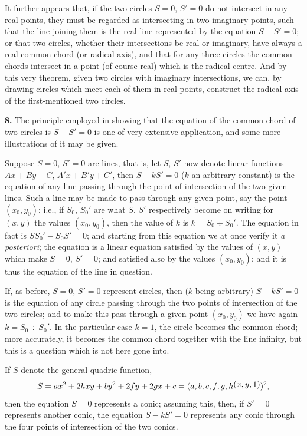 \documentclass[11pt,a4paper]{book}
\begin{document}
It further appears that, if the two circles $S=0$, $S'=0$ do not intersect in any real points, they must be regarded as intersecting in two imaginary points, such that the line joining them is the real line represented by the equation $S-S'=0$; or that two circles, whether their intersections be real or imaginary, have always a real common chord (or radical axis), and that for any three circles the common chords intersect in a point (of course real) which is the radical centre. And by this very theorem, given two circles with imaginary intersections, we can, by drawing circles which meet each of them in real points, construct the radical axis of the first-mentioned two circles.

\textbf{8.} The principle employed in showing that the equation of the common chord of two circles is $S-S'=0$ is one of very extensive application, and some more illustrations of it may be given.

Suppose $S=0$, $S'=0$ are lines, that is, let $S$, $S'$ now denote linear functions $Ax+By+C$, $A'x+B'y+C'$, then $S-kS'=0$ ($k$ an arbitrary constant) is the equation of any line passing through the point of intersection of the two given lines. Such a line may be made to pass through any given point, say the point $(x_0,y_0)$; i.e., if $S_0$, $S_0'$ are what $S$, $S'$ respectively become on writing for $(x,y)$ the values $(x_0,y_0)$, then the value of $k$ is $k=S_0\div S_0'$. The equation in fact is $S S_0' - S_0 S' = 0$; and starting from this equation we at once verify it \textit{a posteriori}; the equation is a linear equation satisfied by the values of $(x,y)$ which make $S=0$, $S'=0$; and satisfied also by the values $(x_0,y_0)$; and it is thus the equation of the line in question.

If, as before, $S=0$, $S'=0$ represent circles, then ($k$ being arbitrary) $S-kS'=0$ is the equation of any circle passing through the two points of intersection of the two circles; and to make this pass through a given point $(x_0,y_0)$ we have again $k=S_0\div S_0'$. In the particular case $k=1$, the circle becomes the common chord; more accurately, it becomes the common chord together with the line infinity, but this is a question which is not here gone into.

If $S$ denote the general quadric function,
\[
S = ax^2 + 2hxy + by^2 + 2fy + 2gx + c = (a,b,c,f,g,h\,\raisebox{0.5ex}{\text{$\!(x,y,1)$}})^2,
\]
then the equation $S=0$ represents a conic; assuming this, then, if $S'=0$ represents another conic, the equation $S-kS'=0$ represents any conic through the four points of intersection of the two conics.
\end{document}
